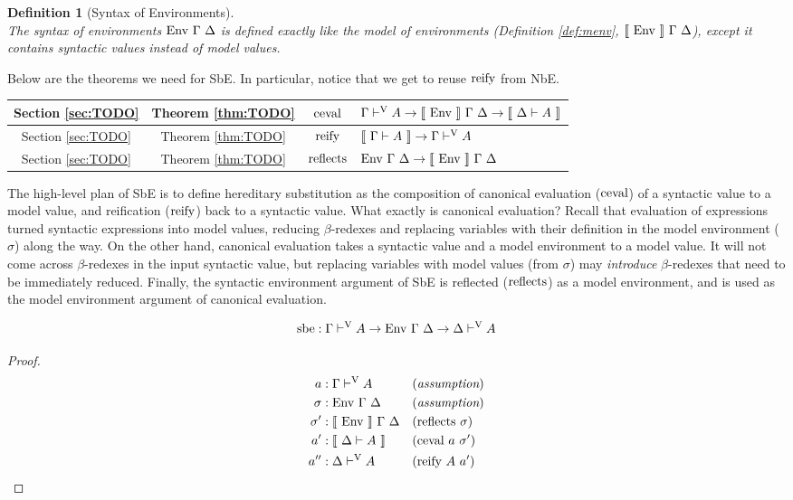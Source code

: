 \documentclass{llncs}
\newtheorem{defin}{Definition}
\newcommand{\refdef}[1]{Definition \ref{def:#1}}
\newcommand{\refthm}[1]{Theorem \ref{thm:#1}}
\newcommand{\refsec}[1]{Section \ref{sec:#1}}
\def\marr{\rightarrow}
\def\reify{\fun{reify}}
\def\reflecte{\fun{reflects}}
\def\cevalv{\fun{ceval}}
\def\sbe{\fun{sbe}}
\def\byass{(\textit{assumption})}
\newcommand{\by}[1]{(#1)}
\newcommand{\turn}[1]{\vdash^\con{#1}}
\newcommand{\el}[1]{\llbracket ~ #1 ~ \rrbracket}
\newcommand{\con}[1]{\textmd{#1}}
\newcommand{\fun}[1]{\textmd{#1}}
\newcommand{\typm}[1]{\el{\Gamma \vdash #1}}
\newcommand{\dtypm}[1]{\el{\Delta \vdash #1}}
\newcommand{\typv}[1]{\Gamma \turn{V} #1}
\newcommand{\dtypv}[1]{\Delta \turn{V} #1}
\def\menv{\el{\fun{Env}}~\Gamma~\Delta}
\def\env{\fun{Env}~\Gamma~\Delta}
\begin{document}
\begin{defin}[Syntax of Environments]
\label{def:senv}
$ $\\
The syntax of environments $\env$ is defined exactly like the model of
environments (\refdef{menv}, $\menv$), except it contains syntactic values
instead of model values.
\end{defin}

Below are the theorems we need for SbE. In particular, notice that we
get to reuse $\reify$ from NbE.

\hfill \break
\begin{tabularx}{\textwidth}{ |c|c|c|X| }
  \hline
  \refsec{TODO} & \refthm{TODO} & $\cevalv$ & $\typv{A} \marr \menv \marr \dtypm{A}$ \\
  \hline
  \refsec{TODO} & \refthm{TODO} & $\reify$ & $\typm{A} \marr \typv{A}$ \\
  \hline
  \refsec{TODO} & \refthm{TODO} & $\reflecte$ & $\env \marr \menv$ \\
  \hline
\end{tabularx}
\hfill \break

The high-level plan of SbE is to define
hereditary substitution as the composition of
canonical evaluation ($\cevalv$) of a syntactic value to a
model value, and reification ($\reify$) back to a syntactic value.
What exactly is canonical evaluation? Recall that evaluation of
expressions turned syntactic expressions into model values, reducing
$\beta$-redexes and replacing variables with their definition in the
model environment ($\sigma$) along the way. On the other hand,
canonical evaluation takes a syntactic value and a model environment
to a model value. It will not come across $\beta$-redexes in the input
syntactic value, but replacing variables with model values (from
$\sigma$) may \textit{introduce} $\beta$-redexes that need to be
immediately reduced. Finally, the syntactic environment argument of
SbE is reflected ($\reflecte$) as a model environment, and is used as the model
environment argument of canonical evaluation.

\begin{theorem}
\label{thm:mod:vhsub}
$$
\sbe : \typv{A} \marr \env \marr \dtypv{A}
$$

\begin{proof}
\begin{align*}
a    &: \typv{A} && \byass\\
\sigma   &: \env && \byass\\
\sigma'  &: \menv && \by{\reflecte~\sigma}\\
a'   &: \dtypm{A} && \by{\cevalv~a~\sigma'}\\
a''  &: \dtypv{A} && \by{\reify~A~a'}
\end{align*}
\end{proof}

\end{theorem}
\end{document}
